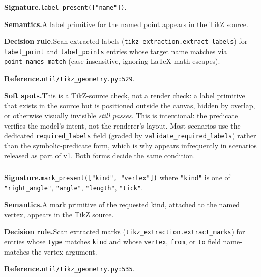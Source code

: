 \subsubsection{}
\label{app:pred:label_present}

\noindent\textbf{Signature.}\quad \texttt{label\_present(["name"])}.

\noindent\textbf{Semantics.}\quad A label primitive for the named point appears in the TikZ source.

\noindent\textbf{Decision rule.}\quad Scan extracted labels (\texttt{tikz\_extraction.extract\_labels}) for \texttt{label\_point} and \texttt{label\_points} entries whose target name matches via \texttt{point\_names\_match} (case-insensitive, ignoring \LaTeX-math escapes).

\noindent\textbf{Reference.}\quad \texttt{util/tikz\_geometry.py:529}.

\noindent\textbf{Soft spots.}\quad This is a TikZ-source check, not a render check: a label primitive that exists in the source but is positioned outside the canvas, hidden by overlap, or otherwise visually invisible \emph{still passes}.
This is intentional: the predicate verifies the model's intent, not the renderer's layout.
Most scenarios use the dedicated \texttt{required\_labels} field (graded by \texttt{validate\_required\_labels}) rather than the symbolic-predicate form, which is why  appears infrequently in scenarios released as part of v1.
Both forms decide the same condition.

\subsubsection{}
\label{app:pred:mark_present}

\noindent\textbf{Signature.}\quad \texttt{mark\_present(["kind", "vertex"])} where \texttt{"kind"} is one of \texttt{"right\_angle"}, \texttt{"angle"}, \texttt{"length"}, \texttt{"tick"}.

\noindent\textbf{Semantics.}\quad A mark primitive of the requested kind, attached to the named vertex, appears in the TikZ source.

\noindent\textbf{Decision rule.}\quad Scan extracted marks (\texttt{tikz\_extraction.extract\_marks}) for entries whose \texttt{type} matches \texttt{kind} and whose \texttt{vertex}, \texttt{from}, or \texttt{to} field name-matches the vertex argument.

\noindent\textbf{Reference.}\quad \texttt{util/tikz\_geometry.py:535}.


